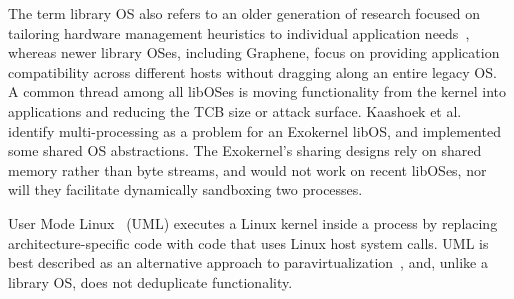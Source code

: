 The term library OS also refers to an older generation of research
focused on tailoring hardware management heuristics 
to individual application needs~\citep{kaashoek97exokernel,anderson92libos,cheriton94cache,leslie96nemesis,libra},
whereas newer library OSes, including Graphene, focus
on providing application compatibility
across different hosts without dragging along an entire legacy OS.
A common thread among all libOSes is moving functionality from the kernel
into applications and reducing the TCB size or attack surface.
Kaashoek et al.~\citep{kaashoek97exokernel} identify multi-processing as a problem for an Exokernel libOS,
and implemented some shared OS abstractions.
The Exokernel's sharing designs rely on shared memory rather than byte streams,
and would not work on recent libOSes,
nor will they facilitate dynamically sandboxing two processes.


\begin{comment}
Dune~\citep{belay12dune} %
leverages virtualization hardware 
to allow an application
to safely manage privileged CPU features
such as page tables and interrupts.
Dune's goals are complimentary to ours; we expect that
certain aspects of the PAL implementation would be simplified on Dune.
\end{comment}

User Mode Linux~\citep{user-mode-linux} (UML) executes a Linux kernel inside a process
by replacing  architecture-specific code with 
code 
that uses Linux host system calls. %
UML is best described as  an alternative approach to paravirtualization~\citep{barham03xen},
and, unlike a library OS, does not deduplicate functionality.

